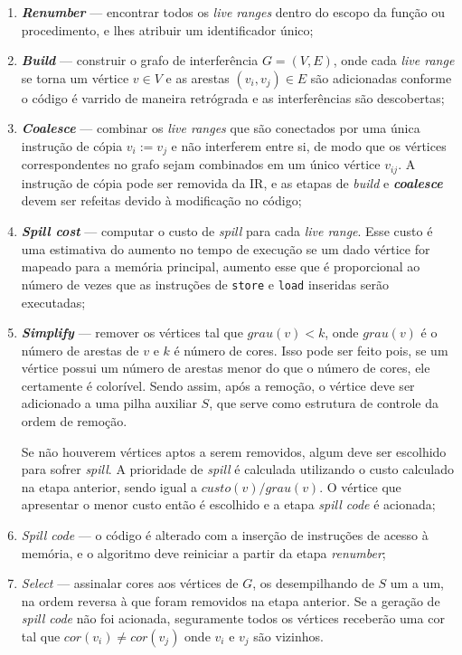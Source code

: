 \documentclass[
	12pt,				%
	openright,			%
	twoside,			%
	a4paper,			%
	tcc,			%
	]{ABNT-DC-UEL}
\begin{document}
\begin{enumerate}
    \item \textit{\textbf{Renumber}} --- encontrar todos os \textit{live ranges} dentro do escopo da função ou procedimento, e lhes atribuir um identificador único;
    \item \textit{\textbf{Build}} --- construir o grafo de interferência $G = (V,E)$, onde cada \textit{live range} se torna um vértice $v\in 
    V$ e as arestas $(v_i,v_j)\in E$ são adicionadas conforme o código é varrido de maneira retrógrada e as interferências são descobertas;
    \item \textit{\textbf{Coalesce}} --- combinar os \textit{live ranges} que são conectados por uma única instrução de cópia $v_i:=v_j$ e não interferem entre si, de modo que os vértices correspondentes no grafo sejam combinados em um único vértice $v_{ij}$. A instrução de cópia pode ser removida da IR, e as etapas de \textit{build} e \textit{\textbf{coalesce}} devem ser refeitas devido à modificação no código;
    \item \textit{\textbf{Spill cost}} --- computar o custo de \textit{spill} para cada \textit{live range}. Esse custo é uma estimativa do aumento no tempo de execução se um dado vértice for mapeado para a memória principal, aumento esse que é proporcional ao número de vezes que as instruções de \texttt{store} e \texttt{load} inseridas serão executadas;
    \item \textit{\textbf{Simplify}} --- remover os vértices tal que $grau(v)<k$, onde $grau(v)$ é o número de arestas de $v$ e $k$ é número de cores. Isso pode ser feito pois, se um vértice possui um número de arestas menor do que o número de cores, ele certamente é colorível. Sendo assim, após a remoção, o vértice deve ser adicionado a uma pilha auxiliar $S$, que serve como estrutura de controle da ordem de remoção.
    
    Se não houverem vértices aptos a serem removidos, algum deve ser escolhido para sofrer \textit{spill}. A prioridade de \textit{spill} é calculada utilizando o custo calculado na etapa anterior, sendo igual a $custo(v)/grau(v)$. O vértice que apresentar o menor custo então é escolhido e a etapa \textit{spill code} é acionada; 
    \item \textit{Spill code} --- o código é alterado com a inserção de instruções de acesso à memória, e o algoritmo deve reiniciar a partir da etapa \textit{renumber};
    \item \textit{Select} --- assinalar cores aos vértices de $G$, os desempilhando de $S$ um a um, na ordem reversa à que foram removidos na etapa anterior. Se a geração de \textit{spill code} não foi acionada, seguramente todos os vértices receberão uma cor tal que $cor(v_i)\ne cor(v_j)$ onde $v_i$ e $v_j$ são vizinhos.
\end{enumerate}
\end{document}
